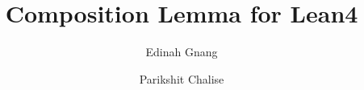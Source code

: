 \documentclass{amsbook}
\title{Composition Lemma for Lean4}
\author{Edinah Gnang}
\author{Parikshit Chalise}
\begin{document}
\linenumbers
\maketitle
\tableofcontents





\end{document}
